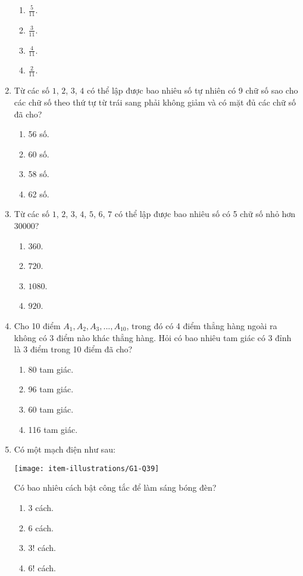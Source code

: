 \begin{enumerate}[label=\textbf{Câu \arabic*.},align=left,left=0cm..0cm,itemindent=*]
\begin{enumerate}[label=\textbf{\Alph*.},align=left,left=1cm..0cm,itemindent=*]
		\item $\frac{5}{11}$. \item $\frac{3}{11}$. \item $\frac{4}{11}$. \item $\frac{2}{11}$.
	\end{enumerate}
	\item Từ các số $1$, $2$, $3$, $4$ có thể lập được bao nhiêu số tự nhiên có 9 chữ số sao cho các chữ số theo thứ tự từ trái sang phải không giảm và có mặt đủ các chữ số đã cho?
	\begin{enumerate}[label=\textbf{\Alph*.},align=left,left=1cm..0cm,itemindent=*]
		\item 56 số. \item 60 số. \item 58 số. \item 62 số.
	\end{enumerate}
	\item Từ các số $1$, $2$, $3$, $4$, $5$, $6$, $7$ có thể lập được bao nhiêu số có 5 chữ số nhỏ hơn $30000$?
	\begin{enumerate}[label=\textbf{\Alph*.},align=left,left=1cm..0cm,itemindent=*]
		\item $360$. \item $720$. \item $1080$. \item $920$.
	\end{enumerate}
	\item Cho 10 điểm $A_1, A_2, A_3,..., A_{10}$, trong đó có 4 điểm thẳng hàng ngoài ra không có 3 điểm nào khác thẳng hàng. Hỏi có bao nhiêu tam giác có 3 đỉnh là 3 điểm trong 10 điểm đã cho?
	\begin{enumerate}[label=\textbf{\Alph*.},align=left,left=1cm..0cm,itemindent=*]
		\item 80 tam giác. \item 96 tam giác. \item 60 tam giác. \item 116 tam giác.
	\end{enumerate}
	\item Có một mạch điện như sau:\par
	{\centering\texttt{[image: item-illustrations/G1-Q39]}\par}
	Có bao nhiêu cách bật công tắc để làm sáng bóng đèn?
	\begin{enumerate}[label=\textbf{\Alph*.},align=left,left=1cm..0cm,itemindent=*]
		\item 3 cách. \item 6 cách. \item $3!$ cách. \item $6!$ cách.

\end{enumerate}
\end{enumerate}
